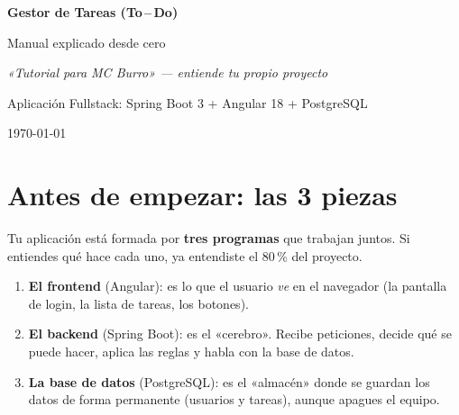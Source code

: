 \documentclass[11pt,a4paper]{article}
\begin{document}
\begin{titlepage}
\centering
\vspace*{3cm}
{\Huge\bfseries Gestor de Tareas (To\,--\,Do)\par}
\vspace{0.6cm}
{\LARGE Manual explicado desde cero\par}
\vspace{0.3cm}
{\large \itshape «Tutorial para MC Burro» --- entiende tu propio proyecto\par}
\vspace{2.5cm}
\vfill
{\large Aplicación Fullstack: Spring Boot 3 + Angular 18 + PostgreSQL\par}
\vspace{0.5cm}
{\large \today\par}
\end{titlepage}

\tableofcontents
\newpage

\section{Antes de empezar: las 3 piezas}

Tu aplicación está formada por \textbf{tres programas} que trabajan juntos. Si
entiendes qué hace cada uno, ya entendiste el 80\,\% del proyecto.

\begin{enumerate}[leftmargin=*]
  \item \textbf{El frontend} (Angular): es lo que el usuario \emph{ve} en el
  navegador (la pantalla de login, la lista de tareas, los botones).
  \item \textbf{El backend} (Spring Boot): es el «cerebro». Recibe peticiones,
  decide qué se puede hacer, aplica las reglas y habla con la base de datos.
  \item \textbf{La base de datos} (PostgreSQL): es el «almacén» donde se guardan
  los datos de forma permanente (usuarios y tareas), aunque apagues el equipo.
\end{enumerate}
\end{document}
